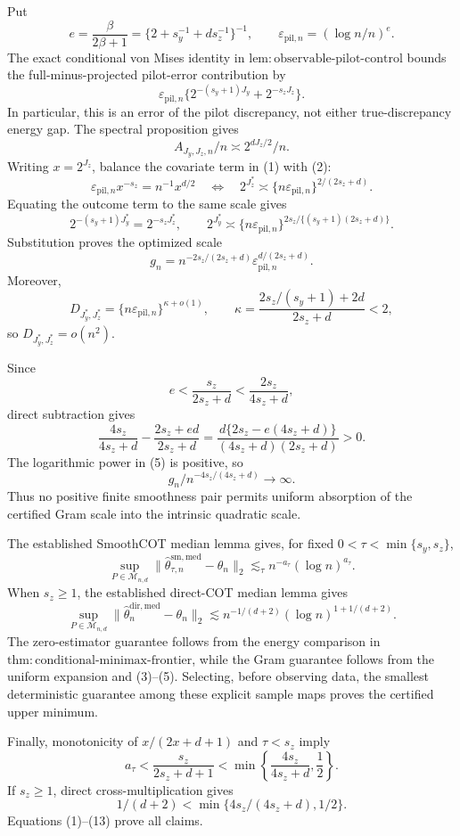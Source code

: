 Put
\[
e=\frac{\beta}{2\beta+1}=\{2+s_y^{-1}+ds_z^{-1}\}^{-1},
\qquad \varepsilon_{\mathrm{pil},n}=(\log n/n)^e.
\]
The exact conditional von Mises identity in \(\mathrm{lem{:}observable\text{-}pilot\text{-}control}\) bounds the full-minus-projected pilot-error contribution by
\[
\varepsilon_{\mathrm{pil},n}
\{2^{-(s_y+1)J_y}+2^{-s_zJ_z}\}. \tag{1}
\]
In particular, this is an error of the pilot discrepancy, not either true-discrepancy energy gap.  The spectral proposition gives
\[
A_{J_y,J_z,n}/n\asymp2^{dJ_z/2}/n. \tag{2}
\]
Writing \(x=2^{J_z}\), balance the covariate term in (1) with (2):
\[
\varepsilon_{\mathrm{pil},n}x^{-s_z}=n^{-1}x^{d/2}
\quad\Longleftrightarrow\quad
2^{J_z^*}\asymp\{n\varepsilon_{\mathrm{pil},n}\}^{2/(2s_z+d)}. \tag{3}
\]
Equating the outcome term to the same scale gives
\[
2^{-(s_y+1)J_y^*}=2^{-s_zJ_z^*},
\qquad
2^{J_y^*}\asymp
\{n\varepsilon_{\mathrm{pil},n}\}^{2s_z/\{(s_y+1)(2s_z+d)\}}. \tag{4}
\]
Substitution proves the optimized scale
\[
g_n=n^{-2s_z/(2s_z+d)}
\varepsilon_{\mathrm{pil},n}^{d/(2s_z+d)}. \tag{5}
\]
Moreover,
\[
D_{J_y^*,J_z^*}
=\{n\varepsilon_{\mathrm{pil},n}\}^{\kappa+o(1)},
\qquad
\kappa=\frac{2s_z/(s_y+1)+2d}{2s_z+d}<2, \tag{6}
\]
so \(D_{J_y^*,J_z^*}=o(n^2)\).

Since
\[
e<\frac{s_z}{2s_z+d}<\frac{2s_z}{4s_z+d}, \tag{7}
\]
direct subtraction gives
\[
\frac{4s_z}{4s_z+d}-\frac{2s_z+ed}{2s_z+d}
=\frac{d\{2s_z-e(4s_z+d)\}}{(4s_z+d)(2s_z+d)}>0. \tag{8}
\]
The logarithmic power in (5) is positive, so
\[
g_n/n^{-4s_z/(4s_z+d)}\to\infty. \tag{9}
\]
Thus no positive finite smoothness pair permits uniform absorption of the certified Gram scale into the intrinsic quadratic scale.

The established SmoothCOT median lemma gives, for fixed \(0<\tau<\min\{s_y,s_z\}\),
\[
\sup_{P\in\mathcal M_{n,d}}
\|\widehat\theta^{\mathrm{sm,med}}_{\tau,n}-\theta_n\|_2
\lesssim_\tau n^{-a_\tau}(\log n)^{a_\tau}. \tag{10}
\]
When \(s_z\ge1\), the established direct-COT median lemma gives
\[
\sup_{P\in\mathcal M_{n,d}}
\|\widehat\theta_n^{\mathrm{dir,med}}-\theta_n\|_2
\lesssim n^{-1/(d+2)}(\log n)^{1+1/(d+2)}. \tag{11}
\]
The zero-estimator guarantee follows from the energy comparison in \(\mathrm{thm{:}conditional\text{-}minimax\text{-}frontier}\), while the Gram guarantee follows from the uniform expansion and (3)--(5).  Selecting, before observing data, the smallest deterministic guarantee among these explicit sample maps proves the certified upper minimum.

Finally, monotonicity of \(x/(2x+d+1)\) and \(\tau<s_z\) imply
\[
a_\tau<\frac{s_z}{2s_z+d+1}<
\min\left\{\frac{4s_z}{4s_z+d},\frac12\right\}. \tag{12}
\]
If \(s_z\ge1\), direct cross-multiplication gives
\[
1/(d+2)<\min\{4s_z/(4s_z+d),1/2\}. \tag{13}
\]
Equations (1)--(13) prove all claims.
